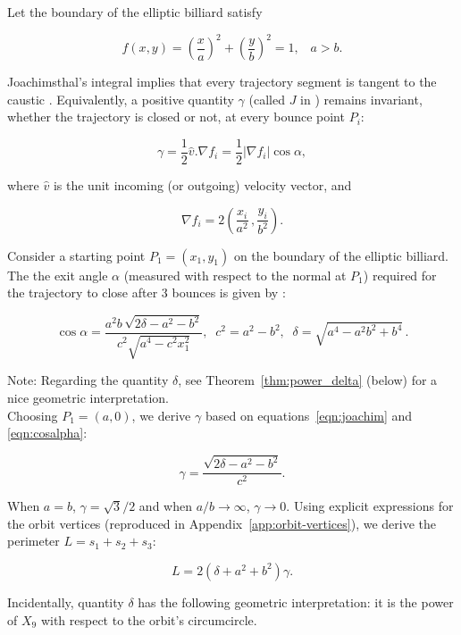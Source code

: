 Let the boundary of the elliptic billiard satisfy

\begin{equation}
\label{eqn:billiard-f}
f(x,y)=\left(\frac{x}{a}\right)^2+\left(\frac{y}{b}\right)^2=1,\;\;\;a>b.
\end{equation}

Joachimsthal's integral implies that every trajectory segment is tangent to the caustic \cite{sergei91}. Equivalently, a positive quantity $\gamma$ (called $J$ in \cite{akopyan2020-invariants,bialy2020-invariants}) remains invariant, whether the trajectory is closed or not, at every bounce point $P_i$:

\begin{equation}
 \gamma=\frac{1}{2}\hat{v}.\nabla{f_i}=\frac{1}{2}|\nabla{f_i}|\cos\alpha,
 \label{eqn:joachim}
\end{equation}

\noindent where $\hat{v}$ is the unit incoming (or outgoing) velocity vector, and

\begin{equation*}
\nabla{f_i}=2\left(\frac{x_i}{a^2}\,,\frac{y_i}{b^2}\right).
\label{eqn:fnable}
\end{equation*}

Consider a starting point $P_1=(x_1,y_1)$ on the boundary of the elliptic billiard. The the exit angle $\alpha$ (measured with respect to the normal at $P_1$) required for the trajectory to close after 3 bounces is given by \cite{garcia2019-ellipses}: 

\begin{equation}
\cos{\alpha}={\frac {a^2 b \, \sqrt {2 \delta-{a}^{2}-{b}^{2}}}{{c}^{2}\sqrt {{a}^{4}-{c}^{2} x_1^{2}}}}, \;\; c^2=a^2-b^2,\;\; \delta=\sqrt{a^4-a^2b^2+b^4}\,.
\label{eqn:cosalpha}
\end{equation}

\noindent Note: Regarding the quantity $\delta$, see Theorem~\ref{thm:power_delta} (below) for a nice geometric interpretation. \\

Choosing $P_1=(a,0)$, we derive $\gamma$ based on equations~\eqref{eqn:joachim} and \eqref{eqn:cosalpha}:

\begin{equation}
\gamma=\frac{\sqrt{2\delta-a^2-b^2}}{c^2}.
\end{equation}

\noindent When $a=b$, $\gamma=\sqrt{3}/2$ and when $a/b{\to}\infty$, $\gamma{\to}0$. \noindent Using explicit expressions for the orbit vertices \cite{garcia2019-ellipses} (reproduced in Appendix~\ref{app:orbit-vertices}), we derive the perimeter $L=s_1+s_2+s_3$: 

\begin{equation}
L=2(\delta+a^2+b^2)\gamma.
\label{eqn:perimeter}
\end{equation}

\noindent Incidentally, quantity $\delta$ has the following geometric interpretation: it is the power of $X_9$ with respect to the orbit's circumcircle.
